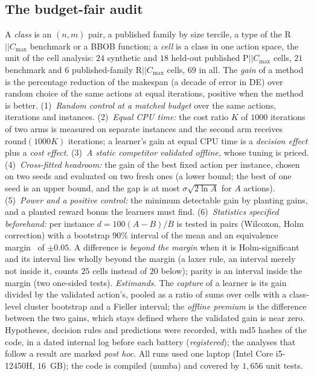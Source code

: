 \documentclass[conference,a4paper]{IEEEtran}
\newcommand{\Cmax}{C_{\max}}
\begin{document}
\subsection{The budget-fair audit}
\label{sec:protocol}
A \emph{class} is an $(n,m)$ pair, a published family by size tercile, a type of the R$||\Cmax$ benchmark or a BBOB function; a \emph{cell} is a class in one action space, the unit of the cell analysis: $24$ synthetic and $18$ held-out published P$||\Cmax$ cells, $21$ benchmark and $6$ published-family R$||\Cmax$ cells, $69$ in all.
The \emph{gain} of a method is the percentage reduction of the makespan (a decade of error in DE) over random choice of the same actions at equal iterations, positive when the method is better.
(1)~\emph{Random control at a matched budget} over the same actions, iterations and instances.
(2)~\emph{Equal CPU time:} the cost ratio $K$ of $1000$ iterations of two arms is measured on separate instances and the second arm receives $\mathrm{round}(1000K)$ iterations; a learner's gain at equal CPU time is a \emph{decision effect} plus a \emph{cost effect}.
(3)~\emph{A static competitor validated offline,} whose tuning is priced.
(4)~\emph{Cross-fitted headroom:} the gain of the best fixed action per instance, chosen on two seeds and evaluated on two fresh ones (a lower bound; the best of one seed is an upper bound, and the gap is at most $\sigma\sqrt{2\ln A}$ for $A$ actions).
(5)~\emph{Power and a positive control:} the minimum detectable gain by planting gains, and a planted reward bonus the learners must find.
(6)~\emph{Statistics specified beforehand:} per instance $d=100(A-B)/B$ is tested in pairs (Wilcoxon, Holm correction) with a bootstrap $90\%$ interval of the mean and an equivalence margin~\cite{Lakens2017} of $\pm0.05$.
A difference is \emph{beyond the margin} when it is Holm-significant and its interval lies wholly beyond the margin (a laxer rule, an interval merely not inside it, counts $25$ cells instead of $20$ below); parity is an interval inside the margin (two one-sided tests).
\emph{Estimands.} The \emph{capture} of a learner is its gain divided by the validated action's, pooled as a ratio of sums over cells with a class-level cluster bootstrap and a Fieller interval; the \emph{offline premium} is the difference between the two gains, which stays defined where the validated gain is near zero.
Hypotheses, decision rules and predictions were recorded, with md5 hashes of the code, in a dated internal log before each battery (\emph{registered}); the analyses that follow a result are marked \emph{post hoc}.
All runs used one laptop (Intel Core i5-12450H, $16$~GB); the code is compiled (numba) and covered by $1{,}656$ unit tests.
\end{document}
